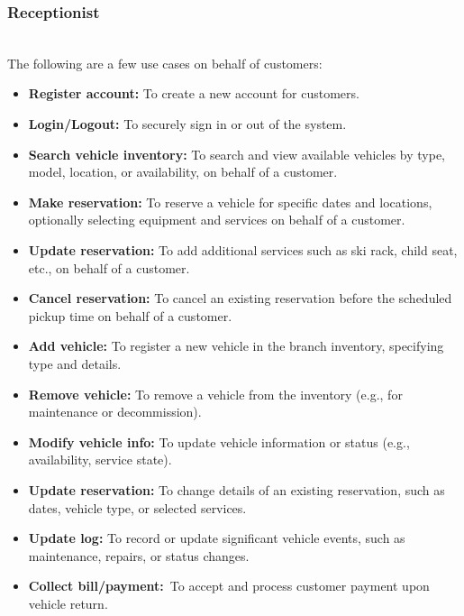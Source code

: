 \subsubsection{Receptionist}\label{kYb2yO1H1AfeLl7xrN-o3}
\\
The following are a few use cases on behalf of customers:

\begin{itemize}
\item
\protect{}\label{TtidFhiccnBflOLu5JEsm}
\textbf{Register account:} To create a new account for customers.
\item
\protect{}\label{Dl8lmOkrwunHC8SpMw7OI}
\textbf{Login/Logout:} To securely sign in or out of the system.
\item
\protect{}\label{L33RkQue8HdYFdcL7S26I}
\textbf{Search vehicle inventory:} To search and view available vehicles by type, model, location, or availability, on behalf of a customer.
\item
\protect{}\label{dqhPs8-cPW1nPsyqOlgPo}
\textbf{Make reservation:} To reserve a vehicle for specific dates and locations, optionally selecting equipment and services on behalf of a customer.
\item
\protect{}\label{8FoieXQOjv9VNa_7Ui51s}
\textbf{Update reservation:} To add additional services such as ski rack, child seat, etc., on behalf of a customer.
\item
\protect{}\label{h0knCgXnlF9JSVo7eZg4F}
\textbf{Cancel reservation:} To cancel an existing reservation before the scheduled pickup time on behalf of a customer.
\item
\protect{}\label{DHHk-dY0cqw-p5sb-ddSs}
\textbf{Add vehicle:} To register a new vehicle in the branch inventory, specifying type and details.
\item
\protect{}\label{3lsym_AEGtHEr3mJ-yFSN}
\textbf{Remove vehicle:} To remove a vehicle from the inventory (e.g., for maintenance or decommission).
\item
\protect{}\label{Nk2Q8pizFndPt7Y6QG4AC}
\textbf{Modify vehicle info:} To update vehicle information or status (e.g., availability, service state).
\item
\protect{}\label{8FoieXQOjv9VNa_7Ui51s}
\textbf{Update reservation:} To change details of an existing reservation, such as dates, vehicle type, or selected services.
\item
\protect{}\label{4m1NEvS402Yd1OmmJzgRP}
\textbf{Update log:} To record or update significant vehicle events, such as maintenance, repairs, or status changes.
\item
\protect{}\label{by-OWITyRIZGR0md1CajX}
\textbf{Collect bill/payment:}~To accept and process customer payment upon vehicle return.
\end{itemize}

